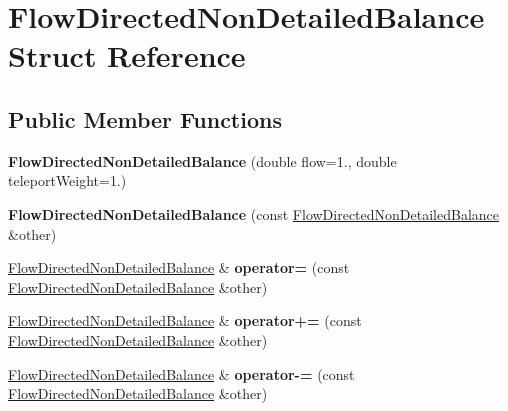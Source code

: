 \hypertarget{structFlowDirectedNonDetailedBalance}{}\section{Flow\+Directed\+Non\+Detailed\+Balance Struct Reference}
\label{structFlowDirectedNonDetailedBalance}
\subsection*{Public Member Functions}
\begin{DoxyCompactItemize}
\item 
\mbox{\label{structFlowDirectedNonDetailedBalance_a62ef5ad388688073a4adf09001ab60ae}} 
{\bfseries Flow\+Directed\+Non\+Detailed\+Balance} (double flow=1., double teleport\+Weight=1.)
\item 
\mbox{\label{structFlowDirectedNonDetailedBalance_ae3a1ab48efb735a7864d4fbc38a40cc4}} 
{\bfseries Flow\+Directed\+Non\+Detailed\+Balance} (const \mbox{\hyperlink{structFlowDirectedNonDetailedBalance}{Flow\+Directed\+Non\+Detailed\+Balance}} \&other)
\item 
\mbox{\label{structFlowDirectedNonDetailedBalance_a3fa72b3e032e4d94a71f9a98528015a7}} 
\mbox{\hyperlink{structFlowDirectedNonDetailedBalance}{Flow\+Directed\+Non\+Detailed\+Balance}} \& {\bfseries operator=} (const \mbox{\hyperlink{structFlowDirectedNonDetailedBalance}{Flow\+Directed\+Non\+Detailed\+Balance}} \&other)
\item 
\mbox{\label{structFlowDirectedNonDetailedBalance_a3244482fba09c732be92fbdc609114fa}} 
\mbox{\hyperlink{structFlowDirectedNonDetailedBalance}{Flow\+Directed\+Non\+Detailed\+Balance}} \& {\bfseries operator+=} (const \mbox{\hyperlink{structFlowDirectedNonDetailedBalance}{Flow\+Directed\+Non\+Detailed\+Balance}} \&other)
\item 
\mbox{\label{structFlowDirectedNonDetailedBalance_a63a2f03cc4ea3506d35711ec2b398cd3}} 
\mbox{\hyperlink{structFlowDirectedNonDetailedBalance}{Flow\+Directed\+Non\+Detailed\+Balance}} \& {\bfseries operator-\/=} (const \mbox{\hyperlink{structFlowDirectedNonDetailedBalance}{Flow\+Directed\+Non\+Detailed\+Balance}} \&other)
\end{DoxyCompactItemize}
